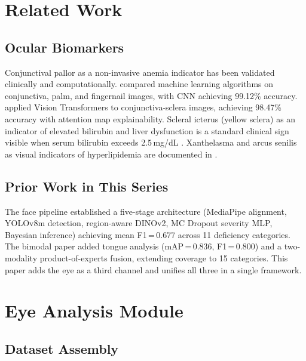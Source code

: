 \documentclass[journal]{IEEEtran}
\begin{document}
\section{Related Work}
\label{sec:related}

\subsection{Ocular Biomarkers}

Conjunctival pallor as a non-invasive anemia indicator has been
validated clinically and computationally. \cite{asare2023} compared
machine learning algorithms on conjunctiva, palm, and fingernail images,
with CNN achieving 99.12\% accuracy. \cite{benson2025} applied Vision
Transformers to conjunctiva-sclera images, achieving 98.47\% accuracy
with attention map explainability. Scleral icterus (yellow sclera) as
an indicator of elevated bilirubin and liver dysfunction is a standard
clinical sign visible when serum bilirubin exceeds 2.5\,mg/dL
\cite{wiki_jaundice}. Xanthelasma and arcus senilis as visual
indicators of hyperlipidemia are documented in \cite{statpearls_arcus}.

\subsection{Prior Work in This Series}

The face pipeline \cite{muhammad2026facefuel} established a five-stage
architecture (MediaPipe alignment, YOLOv8m detection, region-aware DINOv2,
MC Dropout severity MLP, Bayesian inference) achieving mean F1\,=\,0.677
across 11 deficiency categories. The bimodal paper \cite{muhammad2026bimodal}
added tongue analysis (mAP\,=\,0.836, F1\,=\,0.800) and a two-modality
product-of-experts fusion, extending coverage to 15 categories.
This paper adds the eye as a third channel and unifies all three in
a single framework.

\section{Eye Analysis Module}
\label{sec:eye}

\subsection{Dataset Assembly}
\end{document}
